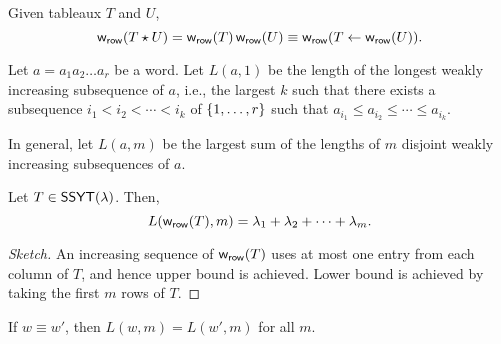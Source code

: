 \begin{lemma}
    Given tableaux \(T\) and \(U\),
    \begin{equation}
        \operatorname{\mathsf{w}_{\text{\textsf{row}}}}(T \star U) = \operatorname{\mathsf{w}_{\text{\textsf{row}}}}(T) \operatorname{\mathsf{w}_{\text{\textsf{row}}}}(U) \equiv \operatorname{\mathsf{w}_{\text{\textsf{row}}}}(T \leftarrow \operatorname{\mathsf{w}_{\text{\textsf{row}}}}(U)).
    \end{equation}
\end{lemma}

Let \(a = a_1a_2 \dots a_r\) be a word.
Let \(L(a, 1)\) be the length of the longest weakly increasing subsequence of \(a\),
i.e., the largest \(k\) such that there exists a subsequence \(i_1 < i_2 < \cdots < i_k\) of \(\interval{r}\) such that \(a_{i_1} \leq a_{i_2} \leq \cdots \leq a_{i_k}\).

In general, let \(L(a, m)\) be the largest sum of the lengths of \(m\) disjoint weakly increasing subsequences of \(a\).

\begin{lemma}
    Let \(T \in \operatorname{\mathsf{SSYT}}(\lambda)\).
    Then,
    \begin{equation}
        L(\operatorname{\mathsf{w}_{\text{\textsf{row}}}}(T), m) = \lambda_1 + \lambda_2 + \cdots + \lambda_m.
    \end{equation}
\end{lemma}

\begin{proof}[Sketch]
    An increasing sequence of \(\operatorname{\mathsf{w}_{\text{\textsf{row}}}}(T)\) uses at most one entry from each column of \(T\), and hence upper bound is achieved.
    Lower bound is achieved by taking the first \(m\) rows of \(T\).
\end{proof}

\begin{lemma}
    If \(w \equiv w'\), then \(L(w, m) = L(w', m)\) for all \(m\).
\end{lemma}

